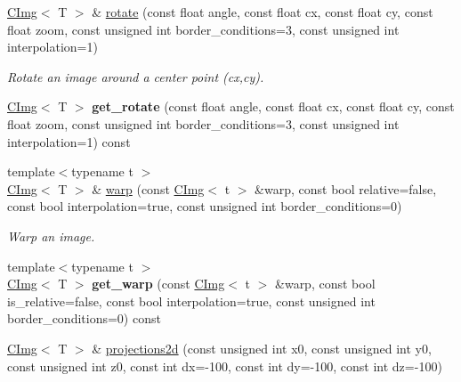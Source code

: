 \begin{DoxyCompactItemize}
\item 
\hyperlink{structcimg__library_1_1CImg}{CImg}$<$ T $>$ \& \hyperlink{structcimg__library_1_1CImg_ae4b06ab7123208c764f6fe1de4d29a39}{rotate} (const float angle, const float cx, const float cy, const float zoom, const unsigned int border\_\-conditions=3, const unsigned int interpolation=1)
\begin{DoxyCompactList}\small\item\em Rotate an image around a center point ({\ttfamily cx},{\ttfamily cy}). \item\end{DoxyCompactList}\item 
\hypertarget{structcimg__library_1_1CImg_ae8522bad57316bb719ef93774fcd77ea}{
\hyperlink{structcimg__library_1_1CImg}{CImg}$<$ T $>$ {\bfseries get\_\-rotate} (const float angle, const float cx, const float cy, const float zoom, const unsigned int border\_\-conditions=3, const unsigned int interpolation=1) const }
\label{structcimg__library_1_1CImg_ae8522bad57316bb719ef93774fcd77ea}

\item 
\hypertarget{structcimg__library_1_1CImg_a66128d00d927613ccc0e41cfd03a50fe}{
{\footnotesize template$<$typename t $>$ }\\\hyperlink{structcimg__library_1_1CImg}{CImg}$<$ T $>$ \& \hyperlink{structcimg__library_1_1CImg_a66128d00d927613ccc0e41cfd03a50fe}{warp} (const \hyperlink{structcimg__library_1_1CImg}{CImg}$<$ t $>$ \&warp, const bool relative=false, const bool interpolation=true, const unsigned int border\_\-conditions=0)}
\label{structcimg__library_1_1CImg_a66128d00d927613ccc0e41cfd03a50fe}

\begin{DoxyCompactList}\small\item\em Warp an image. \item\end{DoxyCompactList}\item 
\hypertarget{structcimg__library_1_1CImg_afb99caa0b50be3e149ed89c351d9e317}{
{\footnotesize template$<$typename t $>$ }\\\hyperlink{structcimg__library_1_1CImg}{CImg}$<$ T $>$ {\bfseries get\_\-warp} (const \hyperlink{structcimg__library_1_1CImg}{CImg}$<$ t $>$ \&warp, const bool is\_\-relative=false, const bool interpolation=true, const unsigned int border\_\-conditions=0) const }
\label{structcimg__library_1_1CImg_afb99caa0b50be3e149ed89c351d9e317}

\item 
\hypertarget{structcimg__library_1_1CImg_a4f4f598be55ec6fb4af8c0f9bb05b91c}{
\hyperlink{structcimg__library_1_1CImg}{CImg}$<$ T $>$ \& \hyperlink{structcimg__library_1_1CImg_a4f4f598be55ec6fb4af8c0f9bb05b91c}{projections2d} (const unsigned int x0, const unsigned int y0, const unsigned int z0, const int dx=-\/100, const int dy=-\/100, const int dz=-\/100)}
\label{structcimg__library_1_1CImg_a4f4f598be55ec6fb4af8c0f9bb05b91c}


\end{DoxyCompactItemize}
